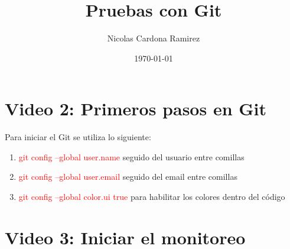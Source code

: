 \documentclass{article}
\title{Pruebas con Git}
\author{Nicolas Cardona Ramirez}
\date{\today}
\begin{document}
	
	\maketitle
	
	\section{Video 2: Primeros pasos en Git}
	
	
	Para iniciar el Git se utiliza lo siguiente:
	\begin{enumerate}
		\item \textcolor{red}{git config --global user.name} seguido del usuario entre comillas
		\item \textcolor{red}{git config --global user.email} seguido del email entre comillas
		\item \textcolor{red}{git config --global color.ui true} para habilitar los colores dentro del código
	\end{enumerate}
	
	\section{Video 3: Iniciar el monitoreo}
	
\end{document}
